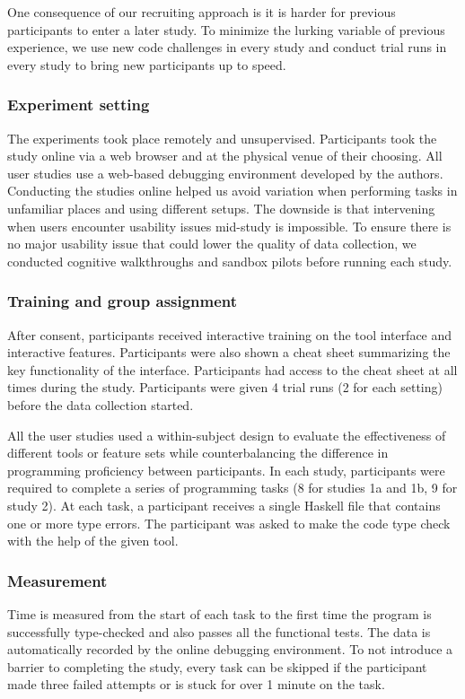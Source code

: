 One consequence of our recruiting approach is it is harder for previous participants to enter a later study. To minimize the lurking variable of previous experience, we use new code challenges in every study and conduct trial runs in every study to bring new participants up to speed.

\subsubsection*{\textbf{Experiment setting}}
The experiments took place remotely and unsupervised. Participants took the study online via a web browser and at the physical venue of their choosing. All user studies use a web-based debugging environment developed by the authors. Conducting the studies online helped us avoid variation when performing tasks in unfamiliar places and using different setups. The downside is that intervening when users encounter usability issues mid-study is impossible. To ensure there is no major usability issue that could lower the quality of data collection, we conducted cognitive walkthroughs and sandbox pilots before running each study.


\subsubsection*{\textbf{Training and group assignment}}
After consent, participants received interactive training on the tool interface and interactive features. Participants were also shown a cheat sheet summarizing the key functionality of the interface. Participants had access to the cheat sheet at all times during the study. Participants were given 4 trial runs (2 for each setting) before the data collection started. 

All the user studies used a within-subject design to evaluate the effectiveness of different tools or feature sets while counterbalancing the difference in programming proficiency between participants. In each study, participants were required to complete a series of programming tasks (8 for studies 1a and 1b, 9 for study 2). At each task, a participant receives a single Haskell file that contains one or more type errors. The participant was asked to make the code type check with the help of the given tool.


\subsubsection*{\textbf{Measurement}}
Time is measured from the start of each task to the first time the program is successfully type-checked and also passes all the functional tests. The data is automatically recorded by the online debugging environment. To not introduce a barrier to completing the study, every task can be skipped if the participant made three failed attempts or is stuck for over 1 minute on the task.

